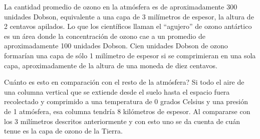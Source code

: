 La cantidad promedio de ozono en la atmósfera es de aproximadamente 300 unidades Dobson, equivalente a una capa de 3 milímetros de espesor, la altura de 2 centavos apilados. Lo que los científicos llaman el ``agujero'' de ozono antártico es un área donde la concentración de ozono cae a un promedio de aproximadamente 100 unidades Dobson. Cien unidades Dobson de ozono formarían una capa de sólo 1 milímetro de espesor si se comprimieran en una sola capa, aproximadamente de la altura de una moneda de diez centavos.

\textquestiondown Cuánto es esto en comparación con el resto de la atmósfera?  Si todo el aire de una columna vertical que se extiende desde el suelo hasta el espacio fuera recolectado y comprimido a una temperatura de 0 grados Celsius y una presión de 1 atmósfera, esa columna tendría 8 kilómetros de espesor. Al compararse con los 3 milímetros descritos anteriormente y con esto uno se da cuenta de cuán tenue es la capa de ozono de la Tierra.
